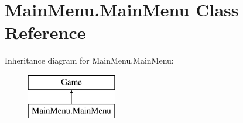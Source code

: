 \hypertarget{class_main_menu_1_1_main_menu}{\section{Main\-Menu.\-Main\-Menu Class Reference}
\label{d6/da3/class_main_menu_1_1_main_menu}
}
Inheritance diagram for Main\-Menu.\-Main\-Menu\-:\begin{figure}[H]
\begin{center}
\leavevmode
\includegraphics[height=2.000000cm]{d6/da3/class_main_menu_1_1_main_menu}
\end{center}
\end{figure}
